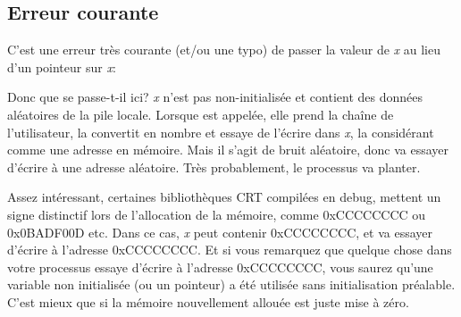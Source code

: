 \subsection{Erreur courante}

C'est une erreur très courante (et/ou une typo) de passer la valeur de \emph{x} au
lieu d'un pointeur sur \emph{x}:



Donc que se passe-t-il ici?
\emph{x} n'est pas non-initialisée et contient des données aléatoires de la pile
locale.
Lorsque \scanf est appelée, elle prend la chaîne de l'utilisateur, la convertit
en nombre et essaye de l'écrire dans \emph{x}, la considérant comme une adresse en
mémoire.
Mais il s'agit de bruit aléatoire, donc \scanf va essayer d'écrire à une adresse
aléatoire.
Très probablement, le processus va planter.

Assez intéressant, certaines bibliothèques \ac{CRT} compilées en debug, mettent
un signe distinctif lors de l'allocation de la mémoire, comme 0xCCCCCCCC ou
0x0BADF00D etc.
Dans ce cas, \emph{x} peut contenir 0xCCCCCCCC, et \scanf va essayer d'écrire à
l'adresse 0xCCCCCCCC.
Et si vous remarquez que quelque chose dans votre processus essaye d'écrire à
l'adresse 0xCCCCCCCC, vous saurez qu'une variable non initialisée (ou un pointeur)
a été utilisée sans initialisation préalable.
C'est mieux que si la mémoire nouvellement allouée est juste mise à zéro.

